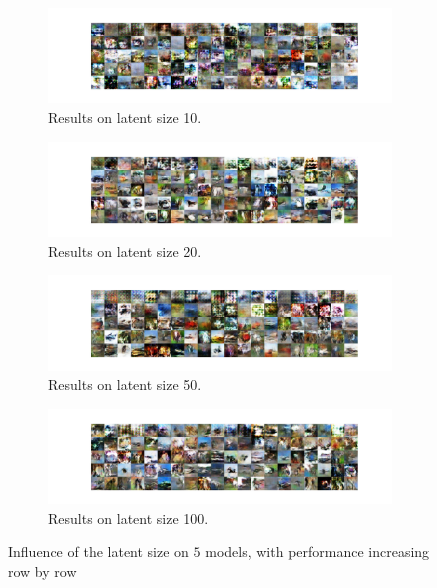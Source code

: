 \documentclass[12pt,letterpaper]{article}
\begin{document}
\begin{figure}[h]
    \begin{subfigure}{0.495\textwidth}
    \includegraphics[width=\linewidth]{WGAN_CIFAR_0_10_256.png}
    \caption{\small Results on latent size 10.} \label{fig:a}
    \end{subfigure}\hspace*{\fill}
    \begin{subfigure}{0.495\textwidth}
    \includegraphics[width=\linewidth]{WGAN_CIFAR_0_20_256.png}
    \caption{\small Results on latent size 20.} \label{fig:b}
    \end{subfigure}
    
    \medskip
    \begin{subfigure}{0.495\textwidth}
    \includegraphics[width=\linewidth]{WGAN_CIFAR_0_50_256.png}
    \caption{\small Results on latent size 50.} \label{fig:c}
    \end{subfigure}\hspace*{\fill}
    \begin{subfigure}{0.495\textwidth}
    \includegraphics[width=\linewidth]{WGAN_CIFAR_0_100_256.png}
    \caption{\small Results on latent size 100.} \label{fig:d}
    \end{subfigure}

    \caption{Influence of the latent size on $5$ models, with performance increasing row by row} \label{fig:CIFAR_WGAN_latent}
\end{figure}
\end{document}
